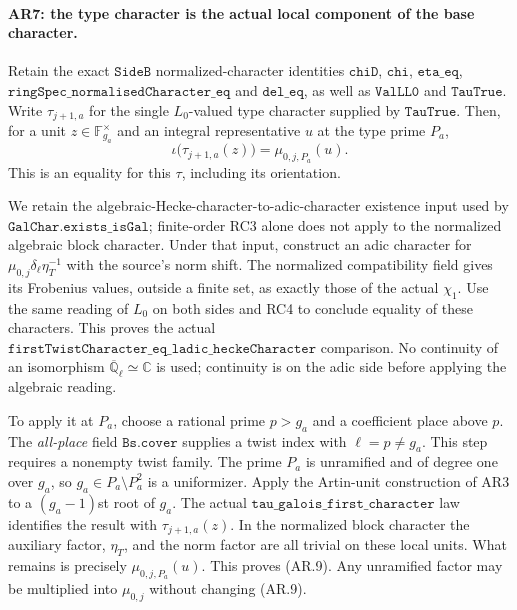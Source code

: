 \paragraph{AR7: the type character is the actual local component of the base character.}
Retain the exact $\texttt{SideB}$ normalized-character identities
$\texttt{chiD}$, $\texttt{chi}$, $\texttt{eta\_eq}$,
$\texttt{ringSpec\_normalisedCharacter\_eq}$ and
$\texttt{del\_eq}$, as well as $\texttt{ValLL0}$ and
$\texttt{TauTrue}$. Write $\tau_{j+1,a}$ for the single $L_0$-valued
type character supplied by $\texttt{TauTrue}$. Then, for a unit
$z\in\mathbb F_{g_a}^{\times}$ and an integral representative $u$ at
the type prime $P_a$,
\[
 \iota\bigl(\tau_{j+1,a}(z)\bigr)=\mu_{0,j,P_a}(u).
                                                               \tag{AR.9}
\]
This is an equality for this $\tau$, including its orientation.

We retain the algebraic-Hecke-character-to-adic-character existence
input used by $\texttt{GalChar.exists\_isGal}$; finite-order RC3 alone
does not apply to the normalized algebraic block character.
Under that input, construct an adic character for
$\mu_{0,j}\delta_\ell\eta_T^{-1}$ with the source's norm shift.
The normalized compatibility field gives its Frobenius values,
outside a finite set, as exactly those of the actual $\chi_1$.
Use the same reading of $L_0$ on both sides and RC4 to conclude
equality of these characters. This proves the actual
$\texttt{firstTwistCharacter\_eq\_ladic\_heckeCharacter}$ comparison.
No continuity of an isomorphism $\overline{\mathbb Q}_\ell\simeq\mathbb C$
is used; continuity is on the adic side before applying the algebraic
reading.

To apply it at $P_a$, choose a rational prime $p>g_a$ and a coefficient
place above $p$. The \emph{all-place} field $\texttt{Bs.cover}$ supplies
a twist index with $\ell=p\ne g_a$. This step requires a nonempty
twist family. The prime $P_a$ is unramified and of degree one over
$g_a$, so $g_a\in P_a\setminus P_a^2$ is a uniformizer. Apply the
Artin-unit construction of AR3 to a $(g_a-1)$st root of $g_a$.
The actual $\texttt{tau\_galois\_first\_character}$ law identifies the
result with $\tau_{j+1,a}(z)$. In the normalized block character the
auxiliary factor, $\eta_T$, and the norm factor are all trivial on
these local units. What remains is precisely $\mu_{0,j,P_a}(u)$.
This proves (AR.9). Any unramified factor may be multiplied into
$\mu_{0,j}$ without changing (AR.9).

